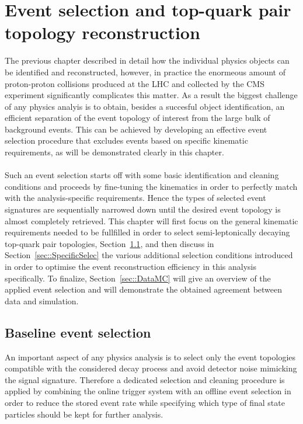 \chapter{Event selection and top-quark pair topology reconstruction} \label{chp:labelTitle}

The previous chapter described in detail how the individual physics objects can be identified and reconstructed, however, in practice the enormeous amount of proton-proton collisions produced at the LHC and collected by the CMS experiment significantly complicates this matter.
As a result the biggest challenge of any physics analyis is to obtain, besides a succesful object identification, an efficient separation of the event topology of interest from the large bulk of background events.
This can be achieved by developing an effective event selection procedure that excludes events based on specific kinematic requirements, as will be demonstrated clearly in this chapter.
\\
\\
Such an event selection starts off with some basic identification and cleaning conditions and proceeds by fine-tuning the kinematics in order to perfectly match with the analysis-specific requirements. Hence the types of selected event signatures are sequentially narrowed down until the desired event topology is almost completely retrieved. This chapter will first focus on the general kinematic requirements needed to be fullfilled in order to select semi-leptonically decaying top-quark pair topologies, Section~\ref{sec::MainSelec}, and then discuss in Section~\ref{sec::SpecificSelec} the various additional selection conditions introduced in order to optimise the event reconstruction efficiency in this analysis specifically.
To finalize, Section~\ref{sec::DataMC} will give an overview of the applied event selection and will demonstrate the obtained agreement between data and simulation.

\section{Baseline event selection}\label{sec::MainSelec}
An important aspect of any physics analysis is to select only the event topologies compatible with the considered decay process and avoid detector noise mimicking the signal signature. 
Therefore a dedicated selection and cleaning procedure is applied by combining the online trigger system with an offline event selection in order to reduce the stored event rate while specifying which type of final state particles should be kept for further analysis.

